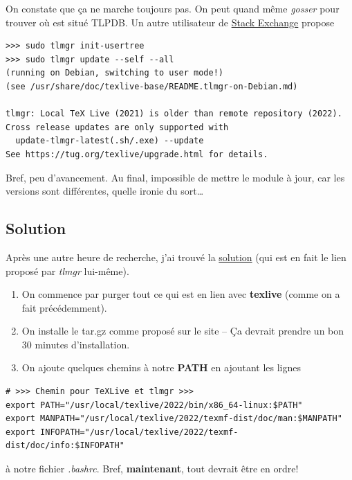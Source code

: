 \documentclass[8pt]{article}
\numberwithin{equation}{section}
\begin{document}
On constate que ça ne marche toujours pas.
On peut quand même \emph{gosser} pour trouver où est situé TLPDB.
Un autre utilisateur de \href{https://tex.stackexchange.com/questions/137428/tlmgr-cannot-setup-tlpdb}{Stack Exchange} propose
\begin{verbatim}
>>> sudo tlmgr init-usertree
>>> sudo tlmgr update --self --all
(running on Debian, switching to user mode!)
(see /usr/share/doc/texlive-base/README.tlmgr-on-Debian.md)

tlmgr: Local TeX Live (2021) is older than remote repository (2022).
Cross release updates are only supported with
  update-tlmgr-latest(.sh/.exe) --update
See https://tug.org/texlive/upgrade.html for details.
\end{verbatim}
Bref, peu d'avancement. 
Au final, impossible de mettre le module à jour, car les versions sont différentes, quelle ironie du sort\ldots{} \newline

\subsection{Solution}
\label{sec:org9d84f6b}
Après une autre heure de recherche, j'ai trouvé la \href{https://www.tug.org/texlive/quickinstall.html}{solution} (qui est en fait le lien proposé par \emph{tlmgr} lui-même).

\begin{enumerate}
\item On commence par purger tout ce qui est en lien avec \textbf{texlive} (comme on a fait précédemment).
\item On installe le tar.gz comme proposé sur le site -- Ça devrait prendre un bon 30 minutes d'installation.
\item On ajoute quelques chemins à notre \textbf{PATH} en ajoutant les lignes
\end{enumerate}
\begin{verbatim}
# >>> Chemin pour TeXLive et tlmgr >>>
export PATH="/usr/local/texlive/2022/bin/x86_64-linux:$PATH"
export MANPATH="/usr/local/texlive/2022/texmf-dist/doc/man:$MANPATH"
export INFOPATH="/usr/local/texlive/2022/texmf-dist/doc/info:$INFOPATH"
\end{verbatim}
à notre fichier \emph{.bashrc}. 
Bref, \textbf{maintenant}, tout devrait être en ordre! \newline
\end{document}

